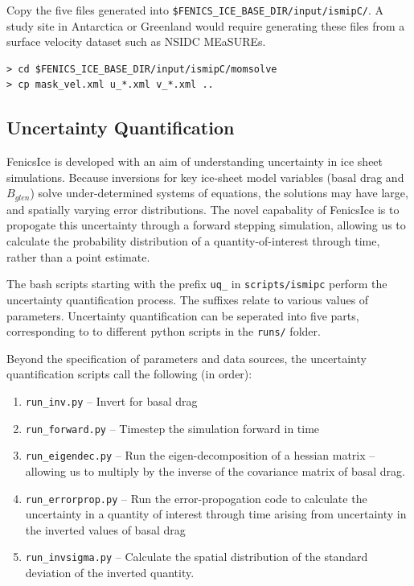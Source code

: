 \documentclass[11pt, reqno, nocenter]{article}
\begin{document}
Copy the five files generated into {\tt \$FENICS\_ICE\_BASE\_DIR/input/ismipC/}. A study site in Antarctica or Greenland would require generating these files  from a surface velocity dataset such as NSIDC MEaSUREs.

\begin{verbatim}
> cd $FENICS_ICE_BASE_DIR/input/ismipC/momsolve
> cp mask_vel.xml u_*.xml v_*.xml ..
\end{verbatim}

\subsection{Uncertainty Quantification}

FenicsIce is developed with an aim of understanding uncertainty in ice sheet simulations. Because inversions for key ice-sheet model variables (basal drag and $B_{glen}$) solve under-determined systems of equations, the solutions may have large, and spatially varying error distributions. The novel capabality of FenicsIce is to propogate this uncertainty through a forward stepping simulation, allowing us to calculate the probability distribution of a quantity-of-interest through time, rather than a point estimate. 

The bash scripts starting with the prefix {\tt uq\_} in {\tt scripts/ismipc} perform the uncertainty quantification process. The suffixes relate to various values of parameters. Uncertainty quantification can be seperated into five parts, corresponding to to different python scripts in the {\tt runs/} folder.

Beyond the specification of parameters and data sources, the uncertainty quantification scripts call the following (in order):

\begin{enumerate}
	\item {\tt run\_inv.py} -- Invert for basal drag
	\item {\tt run\_forward.py} -- Timestep the simulation forward in time
	\item {\tt run\_eigendec.py} -- Run the eigen-decomposition of a hessian matrix -- allowing us to multiply by the inverse of the covariance matrix of basal drag.
	\item {\tt run\_errorprop.py} -- Run the error-propogation code to calculate the uncertainty in a quantity of interest through time arising from uncertainty in the inverted values of basal drag
	\item {\tt run\_invsigma.py} -- Calculate the spatial distribution of the standard deviation of the inverted quantity.
\end{enumerate}
\end{document}
